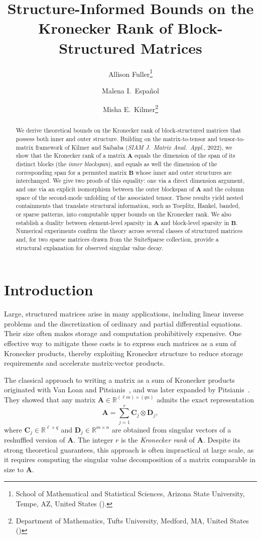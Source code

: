 \documentclass{siamart251216}
\title{Structure-Informed Bounds on the Kronecker Rank of Block-Structured Matrices}
\author{
  Allison Fuller\thanks{School of Mathematical and Statistical Sciences, Arizona State University,
  Tempe, AZ, United States (\email{tjfuller@asu.edu, mespanol@asu.edu}).}
  \and
  Malena I.\ Espa\~{n}ol\footnotemark[1]
  \and
  Misha E.\ Kilmer\thanks{Department of Mathematics, Tufts University, Medford, MA, United States
  (\email{misha.kilmer@tufts.edu})}
}
\date{}
\newcommand{\RR}[2]{\mathbb{R}^{#1 \times #2}}
\def\bA{\mathbf{A}}
\def\bB{\mathbf{B}}
\def\bC{\mathbf{C}}
\def\bD{\mathbf{D}}
\begin{document}
\maketitle


\begin{abstract}
We derive theoretical bounds on the Kronecker rank of block-structured matrices that possess
both inner and outer structure.  Building on the matrix-to-tensor and tensor-to-matrix framework
of Kilmer and Saibaba (\emph{SIAM J.\ Matrix Anal.\ Appl.}, 2022), we show that the Kronecker
rank of a matrix $\bA$ equals the dimension of the span of its distinct blocks (the
\emph{inner blockspan}), and equals as well the dimension of the corresponding span for a
permuted matrix $\bB$ whose inner and outer structures are interchanged.  We give two proofs of
this equality: one via a direct dimension argument, and one via an explicit isomorphism between
the outer blockspan of $\bA$ and the column space of the second-mode unfolding of the associated
tensor.  These results yield nested containments that translate structural information, such as Toeplitz,
Hankel, banded, or sparse patterns, into computable upper bounds on the Kronecker rank.  We also
establish a duality between element-level sparsity in $\bA$ and block-level sparsity in $\bB$.
Numerical experiments confirm the theory across several classes of structured matrices and, for
two sparse matrices drawn from the SuiteSparse collection, provide a structural explanation for
observed singular value decay.
\end{abstract}

\section{Introduction}
Large, structured matrices arise in many applications, including linear inverse problems and the discretization of ordinary and partial differential equations. Their size often makes storage and computation prohibitively expensive. One effective way to mitigate these costs is to express such matrices as a sum of Kronecker products, thereby exploiting Kronecker structure to reduce storage requirements and accelerate matrix-vector products. 

The classical approach to writing a matrix as a sum of Kronecker products originated with Van Loan and Pitsianis~\cite{loan1992approximation}, and was later expanded by Pitsianis~\cite{pitsianis1997kronecker}. They showed that any matrix $\bA\in\RR{(\ell m)}{(qn)}$ admits the exact representation
\begin{equation*}
    \bA = \sum_{j=1}^r \bC_j\otimes \bD_j,
\end{equation*}
where $\bC_j\in\RR{\ell}{q}$ and $\bD_j\in\RR{m}{n}$ are obtained from singular vectors of a reshuffled version of $\bA$. The integer $r$ is the \emph{Kronecker rank} of $\bA$. Despite its strong theoretical guarantees, this approach is often impractical at large scale, as it requires computing the singular value decomposition of a matrix comparable in size to $\bA$.
\end{document}
